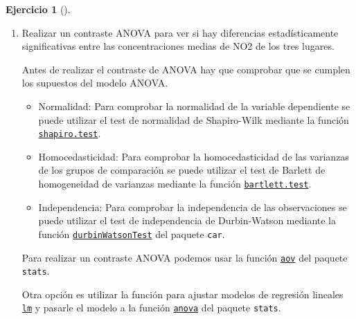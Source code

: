 \documentclass[
  a4paper,
]{scrreport}
\providecommand{\tightlist}{%
  \setlength{\itemsep}{0pt}\setlength{\parskip}{0pt}}\usepackage{longtable,booktabs,array}
\theoremstyle{definition}
\newtheorem{exercise}{Ejercicio}[chapter]
\theoremstyle{remark}
\begin{document}
\begin{exercise}[]
\begin{enumerate}
\begin{tcolorbox}
  \end{tcolorbox}
\item
  Realizar un contraste ANOVA para ver si hay diferencias
  estadísticamente significativas entre las concentraciones medias de
  NO2 de los tres lugares.

  \begin{tcolorbox}[enhanced jigsaw, breakable, toptitle=1mm, colbacktitle=quarto-callout-note-color!10!white, rightrule=.15mm, opacityback=0, opacitybacktitle=0.6, titlerule=0mm, coltitle=black, colframe=quarto-callout-note-color-frame, colback=white, bottomtitle=1mm, leftrule=.75mm, toprule=.15mm, title=\textcolor{quarto-callout-note-color}{\faInfo}\hspace{0.5em}{Ayuda}, arc=.35mm, bottomrule=.15mm, left=2mm]

  Antes de realizar el contraste de ANOVA hay que comprobar que se
  cumplen los supuestos del modelo ANOVA.

  \begin{itemize}
  \tightlist
  \item
    Normalidad: Para comprobar la normalidad de la variable dependiente
    se puede utilizar el test de normalidad de Shapiro-Wilk mediante la
    función
    \href{https://www.rdocumentation.org/packages/stats/versions/3.6.2/topics/shapiro.test}{\texttt{shapiro.test}}.
  \item
    Homocedasticidad: Para comprobar la homocedasticidad de las
    varianzas de los grupos de comparación se puede utilizar el test de
    Barlett de homogeneidad de varianzas mediante la función
    \href{https://www.rdocumentation.org/packages/stats/versions/3.6.2/topics/bartlett.test}{\texttt{bartlett.test}}.
  \item
    Independencia: Para comprobar la independencia de las observaciones
    se puede utilizar el test de independencia de Durbin-Watson mediante
    la función
    \href{https://www.rdocumentation.org/packages/car/versions/3.1-2/topics/durbinWatsonTest}{\texttt{durbinWatsonTest}}
    del paquete \texttt{car}.
  \end{itemize}

  Para realizar un contraste ANOVA podemos usar la función
  \href{https://rdrr.io/r/stats/aov.html}{\texttt{aov}} del paquete
  \texttt{stats}.

  Otra opción es utilizar la función para ajustar modelos de regresión
  lineales
  \href{https://www.rdocumentation.org/packages/stats/versions/3.6.2/topics/lm}{\texttt{lm}}
  y pasarle el modelo a la función
  \href{https://rdrr.io/r/stats/anova.html}{\texttt{anova}} del paquete
  \texttt{stats}.


\end{tcolorbox}
\end{enumerate}
\end{exercise}
\end{document}
